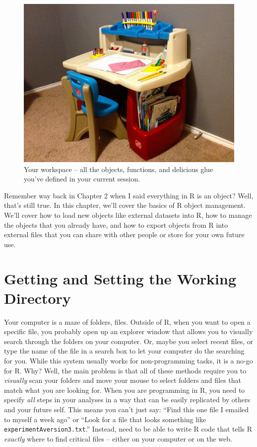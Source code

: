 \documentclass[
]{book}
\begin{document}
\begin{figure}

{\centering \includegraphics[width=0.75\linewidth]{images/workspace} 

}

\caption{Your workspace -- all the objects, functions, and delicious glue you've defined in your current session.}\label{fig:workspace}
\end{figure}

Remember way back in Chapter 2 when I said everything in R is an object? Well, that's still true. In this chapter, we'll cover the basics of R object management. We'll cover how to load new objects like external datasets into R, how to manage the objects that you already have, and how to export objects from R into external files that you can share with other people or store for your own future use.

\hypertarget{getting-and-setting-the-working-directory}{%
\section{Getting and Setting the Working Directory}\label{getting-and-setting-the-working-directory}}

Your computer is a maze of folders, files. Outside of R, when you want to open a specific file, you probably open up an explorer window that allows you to visually search through the folders on your computer. Or, maybe you select recent files, or type the name of the file in a search box to let your computer do the searching for you. While this system usually works for non-programming tasks, it is a no-go for R. Why? Well, the main problem is that all of these methods require you to \emph{visually} scan your folders and move your mouse to select folders and files that match what you are looking for. When you are programming in R, you need to specify \emph{all} steps in your analyses in a way that can be easily replicated by others and your future self. This means you can't just say: ``Find this one file I emailed to myself a week ago'' or ``Look for a file that looks something like \texttt{experimentAversion3.txt}.'' Instead, need to be able to write R code that tells R \emph{exactly} where to find critical files -- either on your computer or on the web.
\end{document}
